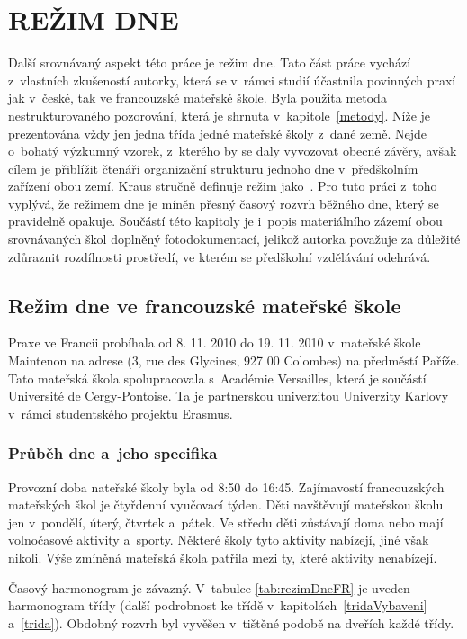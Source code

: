 \chapter{REŽIM DNE}
\label{rezim}
	Další srovnávaný aspekt této práce je režim dne. Tato část práce vychází z~vlastních zkušeností autorky, která se v~rámci studií účastnila povinných praxí jak v~české, tak ve francouzské mateřské škole. Byla použita metoda nestrukturovaného pozorování, která je shrnuta v~kapitole~\ref{metody}. Níže je prezentována vždy jen jedna třída jedné mateřské školy z~dané země. Nejde o~bohatý výzkumný vzorek, z~kterého by se daly vyvozovat obecné závěry, avšak cílem je přiblížit čtenáři organizační strukturu jednoho dne v~předškolním zařízení obou zemí. Kraus stručně definuje režim jako\textit{}~\citep[s.~700]{Kraus}.
	Pro tuto práci z~toho vyplývá, že režimem dne je míněn přesný časový rozvrh běžného dne, který se pravidelně opakuje.
	Součástí této kapitoly je i~popis materiálního zázemí obou srovnávaných škol doplněný fotodokumentací, jelikož autorka považuje za důležité zdůraznit rozdílnosti prostředí, ve kterém se předškolní vzdělávání odehrává.
	
	\section{Režim dne ve francouzské mateřské škole}

		Praxe ve Francii probíhala od 8. 11. 2010 do 19. 11. 2010 v~mateřské škole Maintenon na adrese (3, rue des Glycines, 927 00 Colombes) na předměstí Paříže. Tato mateřská škola spolupracovala s~Académie Versailles, která je součástí Université de Cergy-Pontoise. Ta je partnerskou univerzitou Univerzity Karlovy v~rámci studentského projektu Erasmus. 


		\subsection{Průběh dne a~jeho specifika}

			Provozní doba nateřské školy byla od 8:50 do 16:45. Zajímavostí francouzských mateřských škol je čtyřdenní vyučovací týden. Děti navštěvují mateřskou školu jen v~pondělí, úterý, čtvrtek a~pátek. Ve středu děti zůstávají doma nebo mají volnočasové aktivity a~sporty. Některé školy tyto aktivity nabízejí, jiné však nikoli. Výše zmíněná mateřská škola patřila mezi ty, které aktivity nenabízejí. 
			
			Časový harmonogram je závazný. V~tabulce \ref{tab:rezimDneFR} je uveden harmonogram třídy  (další podrobnost ke třídě v~kapitolách~\ref{tridaVybaveni} a~\ref{trida}). Obdobný rozvrh byl vyvěšen v tištěné podobě na dveřích každé třídy. 


